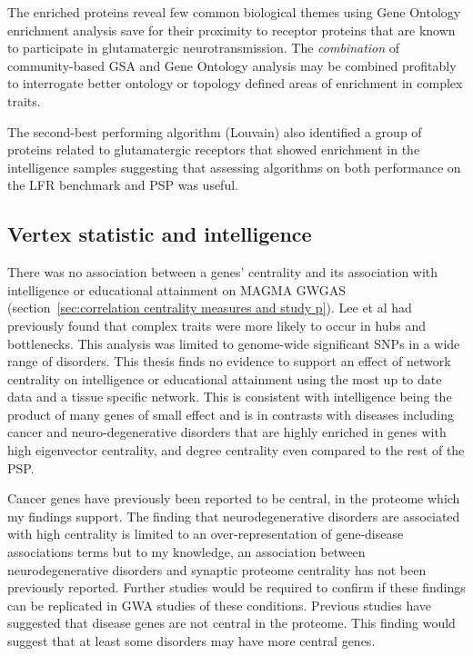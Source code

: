 The enriched proteins reveal few common biological themes using Gene Ontology enrichment analysis save for their proximity to receptor proteins that are known to participate in glutamatergic neurotransmission.
 The\textit{ combination} of community-based GSA and Gene Ontology analysis may be combined profitably to interrogate better ontology or topology defined areas of enrichment in complex traits. 

The second-best performing algorithm (Louvain) also identified a group of proteins related to glutamatergic receptors that showed enrichment in the intelligence samples suggesting that assessing algorithms on both performance on the LFR benchmark and PSP was useful. 


\subsection{Vertex statistic and intelligence}

There was no association between a genes' centrality and its association with intelligence or educational attainment on MAGMA GWGAS (section~\ref{sec:correlation centrality measures and study p}). Lee et al\cite{lee2013network} had previously found that complex traits were more likely to occur in hubs and bottlenecks. This analysis was limited to genome-wide significant SNPs in a wide range of disorders. This thesis finds no evidence to support an effect of network centrality on intelligence or educational attainment using the most up to date data and a tissue specific network. This is consistent with intelligence being the product of many genes of small effect and is in contrasts with diseases including cancer and neuro-degenerative disorders that are highly enriched in genes with high eigenvector centrality, and degree centrality even compared to the rest of the PSP.

Cancer genes have previously been reported to be central\cite{wachi2005interactome},\cite{ozgur2008identifying} in the proteome which my findings support. The finding that neurodegenerative disorders are associated with high centrality is limited to an over-representation of gene-disease associations terms but to my knowledge, an association between neurodegenerative disorders and synaptic proteome centrality has not been previously reported. Further studies would be required to confirm if these findings can be replicated in GWA studies of these conditions. Previous studies have suggested that disease genes are not central\cite{barabasi2011network} in the proteome.  This finding would suggest that at least some disorders may have more central genes. 


